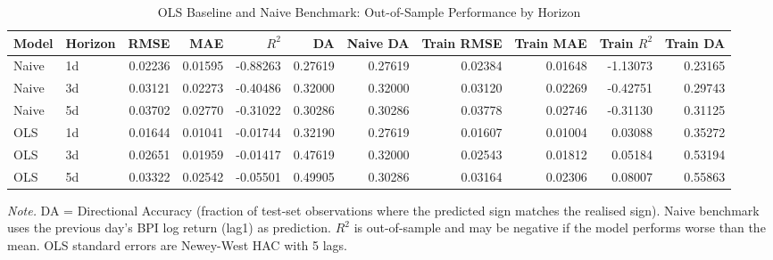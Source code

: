 \begin{table}[!ht]
\centering
\caption{OLS Baseline and Naive Benchmark: Out-of-Sample Performance by Horizon}
\label{tab:ols_metrics}
\footnotesize
\setlength{\tabcolsep}{3.5pt}

\begin{tabular}{llrrrrrrrrr}
\toprule
Model & Horizon & RMSE & MAE & $R^2$ & DA & Naive DA & Train RMSE & Train MAE & Train $R^2$ & Train DA\\
\midrule
Naive & 1d & 0.02236 & 0.01595 & -0.88263 & 0.27619 & 0.27619 & 0.02384 & 0.01648 & -1.13073 & 0.23165\\
Naive & 3d & 0.03121 & 0.02273 & -0.40486 & 0.32000 & 0.32000 & 0.03120 & 0.02269 & -0.42751 & 0.29743\\
Naive & 5d & 0.03702 & 0.02770 & -0.31022 & 0.30286 & 0.30286 & 0.03778 & 0.02746 & -0.31130 & 0.31125\\
OLS & 1d & 0.01644 & 0.01041 & -0.01744 & 0.32190 & 0.27619 & 0.01607 & 0.01004 & 0.03088 & 0.35272\\
OLS & 3d & 0.02651 & 0.01959 & -0.01417 & 0.47619 & 0.32000 & 0.02543 & 0.01812 & 0.05184 & 0.53194\\
OLS & 5d & 0.03322 & 0.02542 & -0.05501 & 0.49905 & 0.30286 & 0.03164 & 0.02306 & 0.08007 & 0.55863\\
\bottomrule
\end{tabular}
\begin{tablenotes}
\footnotesize
\item \textit{Note.} DA = Directional Accuracy (fraction of test-set observations where the predicted sign matches the realised sign). Naive benchmark uses the previous day's BPI log return (lag1) as prediction. $R^2$ is out-of-sample and may be negative if the model performs worse than the mean. OLS standard errors are Newey-West HAC with 5 lags.
\end{tablenotes}
\end{table}
